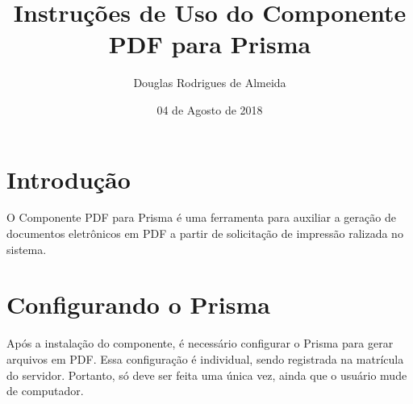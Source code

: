 \documentclass[12pt,a4paper]{article}
\title{Instruções de Uso do Componente PDF para Prisma}
\author{Douglas Rodrigues de Almeida}
\date{04 de Agosto de 2018}
\begin{document}
\maketitle

\section{Introdução}
O Componente PDF para Prisma é uma ferramenta para auxiliar a geração de documentos eletrônicos em PDF a partir de solicitação de impressão ralizada no sistema.

\section{Configurando o Prisma}
Após a instalação do componente, é necessário configurar o Prisma para gerar arquivos em PDF. Essa configuração é individual, sendo registrada na matrícula do servidor. Portanto, só deve ser feita uma única vez, ainda que o usuário mude de computador.
\end{document}
